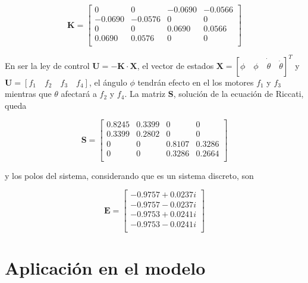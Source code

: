 \documentclass[twoside,11pt]{book}
\begin{document}
\begin{equation}
\mathbf{K}= \left[ \begin{array}{cccc}
         0  &      0  &  -0.0690  & -0.0566 \\
   -0.0690 &   -0.0576    &     0    &     0 \\
         0    &     0 &   0.0690  &  0.0566 \\
    0.0690  &  0.0576    &     0    &     0 \\ \end{array} \right]
   \label{Kmatrix}
\end{equation}

En ser la ley de control $\pmb{U}=-\mathbf{K}\cdot \mathbf{X}$, el vector de estados $\mathbf{X}=[\phi \quad \dot{\phi \quad \theta \quad \dot{\theta}}]^{T}$ y $\mathbf{U}=[f_{1} \quad f_{2} \quad f_{3} \quad f_{4}]$, el ángulo $\phi$ tendrán efecto en el los motores $f_{1}$ y  $f_{3}$ mientras que $\theta$ afectará a $f_{2}$ y $f_{4}$. La matriz $\mathbf{S}$, solución de la ecuación de Riccati, queda

\begin{equation}
\mathbf{S}= \left[ \begin{array}{cccc}

    0.8245  &  0.3399    &     0 &        0 \\
    0.3399  &  0.2802    &     0   &      0 \\
         0  &       0  &  0.8107  &  0.3286 \\
         0   &      0  & 0.3286  &  0.2664 \\ \end{array}     \right]
\end{equation}

y los polos del sistema, considerando que es un sistema discreto, son

\begin{equation}
\mathbf{E}= \left[ \begin{array}{c}
  -0.9757 + 0.0237i \\
  -0.9757 - 0.0237i \\
  -0.9753 + 0.0241i \\
  -0.9753 - 0.0241i \\
\end{array} \right] 
\end{equation}

\section{Aplicación en el modelo}
\end{document}

